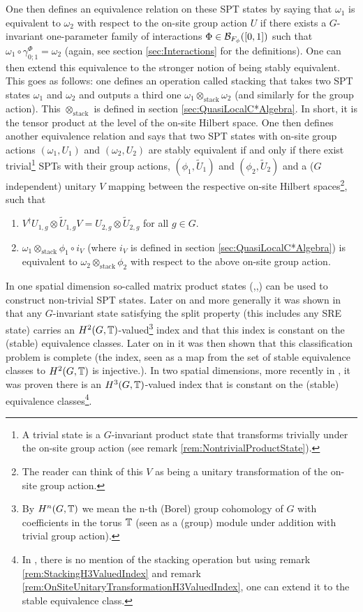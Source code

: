 \documentclass[11pt,a4paper,twoside]{article}
\numberwithin{equation}{section}
\begin{document}
	\\\\
	One then defines an equivalence relation on these SPT states by saying that $\omega_1$ is equivalent to $\omega_2$ with respect to the on-site group action $U$ if there exists a $G$-invariant one-parameter family of interactions $\Phi\in\mathcal B_{F_\phi}([0,1])$ such that $\omega_1\circ\gamma^\Phi_{0;1}=\omega_2$ (again, see section \ref{sec:Interactions} for the definitions). One can then extend this equivalence to the stronger notion of being stably equivalent. This goes as follows: one defines an operation called stacking that takes two SPT states $\omega_1$ and $\omega_2$ and outputs a third one $\omega_1\otimes_{\text{stack}}\omega_2$ (and similarly for the group action). This $\otimes_\text{stack}$ is defined in section \ref{sec:QuasiLocalC*Algebra}. In short, it is the tensor product at the level of the on-site Hilbert space. One then defines another equivalence relation and says that two SPT states with on-site group actions $(\omega_1,U_1)$ and $(\omega_2,U_2)$ are stably equivalent if and only if there exist trivial\footnote{A trivial state is a $G$-invariant product state that transforms trivially under the on-site group action (see remark \ref{rem:NontrivialProductState}).} SPTs with their group actions, $(\phi_1,\tilde{U}_1)$ and $(\phi_2,\tilde{U}_2)$ and a ($G$ independent) unitary $V$ mapping between the respective on-site Hilbert spaces\footnote{The reader can think of this $V$ as being a unitary transformation of the on-site group action.}, such that
	\begin{enumerate}
		\item $V^\dagger U_{1,g}\otimes \tilde{U}_{1,g}V=U_{2,g}\otimes \tilde{U}_{2,g}$ for all $g\in G$.
		\item $\omega_1\otimes_{\text{stack}}\phi_1\circ i_V$ (where $i_V$ is defined in section \ref{sec:QuasiLocalC*Algebra}) is equivalent to $\omega_2\otimes_{\text{stack}}\phi_2$ with respect to the above on-site group action.
	\end{enumerate}
	In one spatial dimension so-called matrix product states (\cite{Chen_2011},\cite{pollman2012symmetry},\cite{schuch2011MatrixProduct}) can be used to construct non-trivial SPT states. Later on and more generally it was shown in \cite{ogata2019classification} that any $G$-invariant state satisfying the split property (this includes any SRE state) carries an $H^2(G,\mathbb T)$-valued\footnote{By $H^n(G,\mathbb T)$ we mean the n-th (Borel) group cohomology of $G$ with coefficients in the torus $\mathbb T$ (seen as a (group) module under addition with trivial group action).} index and that this index is constant on the (stable) equivalence classes. Later on in \cite{kapustin2021classification} it was then shown that this classification problem is complete (the index, seen as a map from the set of stable equivalence classes to $H^2(G,\mathbb T)$ is injective.). In two spatial dimensions, more recently in \cite{ogata2021h3gmathbb}, it was proven there is an $H^3(G,\mathbb T)$-valued index that is constant on the (stable) equivalence classes\footnote{In \cite{ogata2021h3gmathbb}, there is no mention of the stacking operation but using remark \ref{rem:StackingH3ValuedIndex} and remark \ref{rem:OnSiteUnitaryTransformationH3ValuedIndex}, one can extend it to the stable equivalence class.}.
\end{document}
